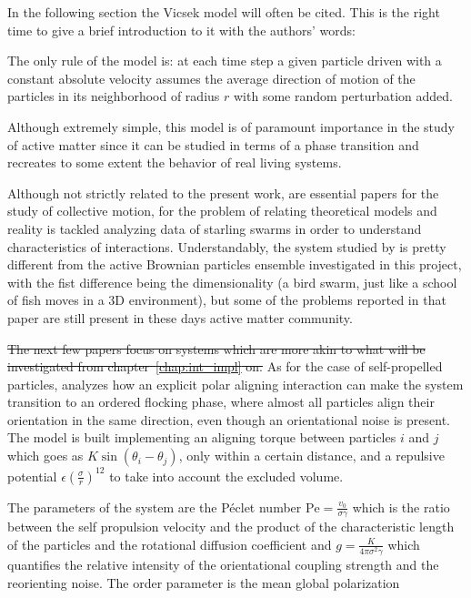 \documentclass[../../master_thesis_np.tex]{subfiles}
\begin{document}
	In the following section the Vicsek model will often be cited. 
	This is the right time to give a brief introduction to it with the authors' words:
	 \begin{displayquote}
		The only rule of the model is: at each time step a given particle driven with a constant absolute velocity assumes the average direction of motion of the particles in its neighborhood of radius $r$ with some random perturbation added.\cite{vicsek_novel_1995}
	 \end{displayquote}
	Although extremely simple, this model is of paramount importance in the study of active matter since it can be studied in terms of a phase transition and recreates to some extent the behavior of real living systems.
	
	Although not strictly related to the present work, \cite{cavagna_empirical_2010, ballerini_interaction_2008} are essential papers for the study of collective motion, for the problem of relating theoretical models and reality is tackled analyzing data of starling swarms in order to understand characteristics of interactions. 
	Understandably, the system studied by \citeauthor{cavagna_empirical_2010, ballerini_interaction_2008} is pretty different from the active Brownian particles ensemble investigated in this project, with the fist difference being the dimensionality (a bird swarm, just like a school of fish moves in a 3D environment), but some of the problems reported in that paper are still present in these days active matter community.
	
	\sout{The next few papers focus on systems which are more akin to what will be investigated from chapter~\ref{chap:int_impl} on.}
	As for the case of self-propelled particles, \cite{martin-gomez_collective_2018} analyzes how an explicit polar aligning interaction can make the system transition to an ordered flocking phase, where almost all particles align their orientation in the same direction, even though an orientational noise is present. 
	The model is built implementing an aligning torque between particles $i$ and $j$ which goes as $K \sin{(\theta_{i} - \theta_{j})}$, only within a certain distance, and a repulsive potential $\epsilon \left(\frac{\sigma}{r}\right)^{12}$ to take into account the excluded volume.
	
	The parameters of the system are the Péclet number $\mathrm{Pe} = \frac{v_0}{\sigma \gamma}$ which is the ratio between the self propulsion velocity and the product of the characteristic length of the particles and the rotational diffusion coefficient  and $g = \frac{K}{4\pi \sigma^2 \gamma}$ which quantifies the relative intensity of the orientational coupling strength and the reorienting noise. 
	The order parameter is the mean global polarization
\end{document}
